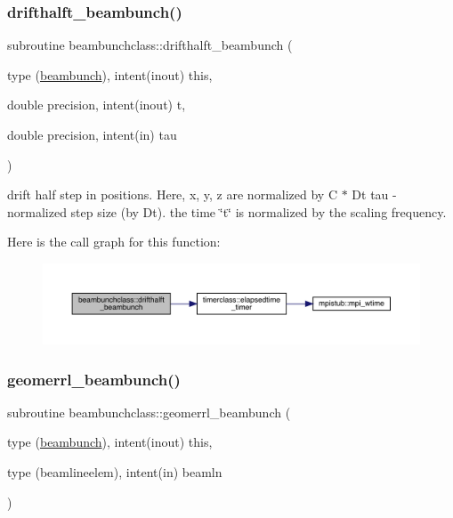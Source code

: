 \subsubsection{\texorpdfstring{drifthalft\_beambunch()}{drifthalft\_beambunch()}}
{\footnotesize\ttfamily subroutine beambunchclass\+::drifthalft\+\_\+beambunch (\begin{DoxyParamCaption}\item[{type (\mbox{\hyperlink{namespacebeambunchclass_structbeambunchclass_1_1beambunch}{beambunch}}), intent(inout)}]{this,  }\item[{double precision, intent(inout)}]{t,  }\item[{double precision, intent(in)}]{tau }\end{DoxyParamCaption})}



drift half step in positions. Here, x, y, z are normalized by C $\ast$ Dt tau -\/ normalized step size (by Dt). the time \char`\"{}t\char`\"{} is normalized by the scaling frequency. 

Here is the call graph for this function\+:\nopagebreak
\begin{figure}[H]
\begin{center}
\leavevmode
\includegraphics[width=350pt]{namespacebeambunchclass_a8970622c75fe29b57d31607d71692976_cgraph}
\end{center}
\end{figure}
\mbox{\label{namespacebeambunchclass_aea8cfefa2f70ade95202cc40f015f7bf}} 
\subsubsection{\texorpdfstring{geomerrl\_beambunch()}{geomerrl\_beambunch()}}
{\footnotesize\ttfamily subroutine beambunchclass\+::geomerrl\+\_\+beambunch (\begin{DoxyParamCaption}\item[{type (\mbox{\hyperlink{namespacebeambunchclass_structbeambunchclass_1_1beambunch}{beambunch}}), intent(inout)}]{this,  }\item[{type (beamlineelem), intent(in)}]{beamln }\end{DoxyParamCaption})}



